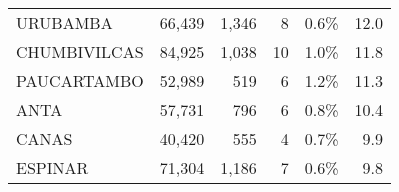 \begin{tabular}{lrrrrr}
	\cellcolor[HTML]{9AFF99}URUBAMBA      & 66,439                                                         & 1,346                                                                           & 8                                                              & 0.6\%                                                                  & 12.0                                                                                                                               \\
	\cellcolor[HTML]{9AFF99}CHUMBIVILCAS  & 84,925                                                         & 1,038                                                                           & 10                                                             & 1.0\%                                                                  & 11.8                                                                                                                               \\
	\cellcolor[HTML]{9AFF99}PAUCARTAMBO   & 52,989                                                         & 519                                                                             & 6                                                              & 1.2\%                                                                  & 11.3                                                                                                                               \\
	\cellcolor[HTML]{9AFF99}ANTA          & 57,731                                                         & 796                                                                             & 6                                                              & 0.8\%                                                                  & 10.4                                                                                                                               \\
	\cellcolor[HTML]{9AFF99}CANAS         & 40,420                                                         & 555                                                                             & 4                                                              & 0.7\%                                                                  & 9.9                                                                                                                                \\
	\cellcolor[HTML]{9AFF99}ESPINAR       & 71,304                                                         & 1,186                                                                           & 7                                                              & 0.6\%                                                                  & 9.8                                                                                                                                \\

\end{tabular}
